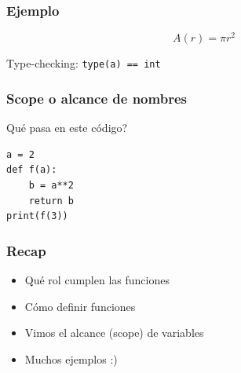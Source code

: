 \documentclass[14pt,aspectratio=169,xcolor=dvipsnames]{beamer}
\begin{document}
\begin{frame}\frametitle{Ejemplo}

$$ A(r) = \pi r^2 $$

\vspace{1cm}
\pause Type-checking: \texttt{type(a) == int}
\end{frame}
\begin{frame}[fragile]\frametitle{Scope o alcance de nombres}
Qué pasa en este código?

\begin{verbatim}
a = 2
def f(a):
    b = a**2
    return b
print(f(3))
\end{verbatim}

\end{frame}
\begin{frame}\frametitle{Recap}
    \begin{itemize}
        \item Qué rol cumplen las funciones
        \item Cómo definir funciones
        \item Vimos el alcance (scope) de variables
        \item Muchos ejemplos :)
    \end{itemize}
\end{frame}
\begin{frame}
    \maketitle
\end{frame}
\end{document}
